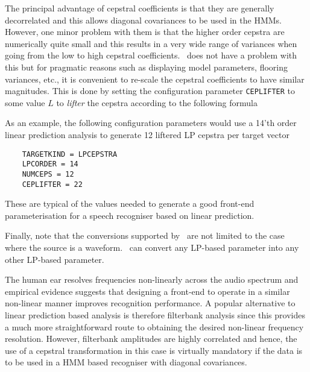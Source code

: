 The principal advantage of cepstral coefficients is that they are 
generally decorrelated and this allows diagonal covariances
to be used in the HMMs.  However, one minor problem with 
them is that the higher order cepstra are numerically quite small and 
this results in
a very wide range of variances when going from the low to high cepstral 
coefficients.
\HTK\ does not have a problem with this but for pragmatic reasons such as
displaying model parameters, flooring variances, etc., it is convenient to re-scale
the cepstral coefficients to have similar magnitudes.  This is done by
setting the configuration parameter \texttt{CEPLIFTER} to some value $L$ to
\textit{lifter} the cepstra according to the following formula

As an example, the following configuration parameters would
use a 14'th order linear prediction analysis to
generate 12 liftered LP cepstra per target vector
\begin{verbatim}
    TARGETKIND = LPCEPSTRA
    LPCORDER = 14
    NUMCEPS = 12
    CEPLIFTER = 22
\end{verbatim}
These are typical of the values needed to generate a good front-end
parameterisation for a speech recogniser based on linear prediction.

Finally, note that the conversions supported by \HTK\ are not limited to
the case where the source is a waveform.  \HTK\ can convert any
LP-based parameter into any other LP-based parameter.


The human ear resolves frequencies non-linearly across the audio spectrum and
empirical evidence suggests that designing a front-end to operate in a similar
non-linear manner improves recognition performance.  A popular alternative to
linear prediction based analysis is therefore filterbank analysis since this
provides a much more straightforward route to obtaining the desired non-linear
frequency resolution.  However, filterbank amplitudes are highly correlated and
hence, the use of a cepstral transformation in this case is virtually mandatory
if the data is to be used in a HMM based recogniser with diagonal covariances.
 

